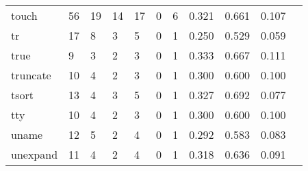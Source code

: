 \begin{longtable}{lp{1.10cm}p{1.10cm}p{1.10cm}p{1.10cm}p{1.10cm}p{1.10cm}p{1.10cm}p{1.10cm}p{1.10cm}p{1.10cm}}
touch     &                     56 &                                 19 &                                14 &                               17 &                                 0 &                               6 &                          0.321 &                                 0.661 &                               0.107 \\
tr        &                     17 &                                  8 &                                 3 &                                5 &                                 0 &                               1 &                          0.250 &                                 0.529 &                               0.059 \\
true      &                      9 &                                  3 &                                 2 &                                3 &                                 0 &                               1 &                          0.333 &                                 0.667 &                               0.111 \\
truncate  &                     10 &                                  4 &                                 2 &                                3 &                                 0 &                               1 &                          0.300 &                                 0.600 &                               0.100 \\
tsort     &                     13 &                                  4 &                                 3 &                                5 &                                 0 &                               1 &                          0.327 &                                 0.692 &                               0.077 \\
tty       &                     10 &                                  4 &                                 2 &                                3 &                                 0 &                               1 &                          0.300 &                                 0.600 &                               0.100 \\
uname     &                     12 &                                  5 &                                 2 &                                4 &                                 0 &                               1 &                          0.292 &                                 0.583 &                               0.083 \\
unexpand  &                     11 &                                  4 &                                 2 &                                4 &                                 0 &                               1 &                          0.318 &                                 0.636 &                               0.091 \\

\end{longtable}
